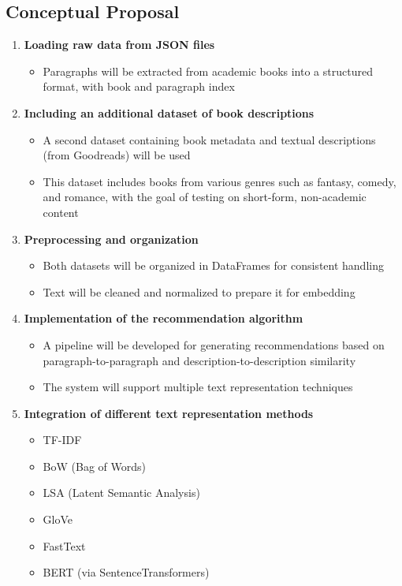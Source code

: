 \documentclass[\myFontSize,oneside,english,hidelinks,a4paper]{article}
\begin{document}
\subsection{Conceptual Proposal}
\begin{enumerate}
    \item \textbf{Loading raw data from JSON files}
    \begin{itemize}
        \item Paragraphs will be extracted from academic books into a structured format, with book and paragraph index
    \end{itemize}

    \item \textbf{Including an additional dataset of book descriptions}
    \begin{itemize}
        \item A second dataset containing book metadata and textual descriptions (from Goodreads) will be used
        \item This dataset includes books from various genres such as fantasy, comedy, and romance, with the goal of testing on short-form, non-academic content
    \end{itemize}

    \item \textbf{Preprocessing and organization}
    \begin{itemize}
        \item Both datasets will be organized in DataFrames for consistent handling
        \item Text will be cleaned and normalized to prepare it for embedding
    \end{itemize}
    
    \item \textbf{Implementation of the recommendation algorithm}
    \begin{itemize}
        \item A pipeline will be developed for generating recommendations based on paragraph-to-paragraph and description-to-description similarity
        \item The system will support multiple text representation techniques
    \end{itemize}

    \item \textbf{Integration of different text representation methods}
    \begin{itemize}
        \item TF-IDF
        \item BoW (Bag of Words)
        \item LSA (Latent Semantic Analysis)
        \item GloVe
        \item FastText
        \item BERT (via SentenceTransformers)
    \end{itemize}


\end{enumerate}
\end{document}
